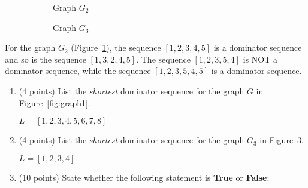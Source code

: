\documentclass[12pt]{article}
\begin{document}
\begin{enumerate}
\begin{figure}[t]
\begin{subfigure}[b]{0.50\linewidth}
        \caption{Graph $G_2$}
        \label{fig:graph2}
        \end{subfigure}
        \begin{subfigure}[b]{0.40\linewidth}
          \centering
        \caption{Graph $G_3$}
        \label{fig:graph3}
        \end{subfigure}
      \caption{}
      \end{figure}

      For the graph $G_2$ (Figure~\ref{fig:graph2}), the sequence $[1,2,3,4,5]$
      is a dominator sequence and so is the sequence $[1,3,2,4,5]$.
      The sequence $[1, 2,3,5,4]$ is NOT a dominator sequence, while
      the sequence $[1,2,3,5,4,5]$ is a dominator sequence. 
      
      \begin{enumerate} 
        \item (4 points) List the \emph{shortest} dominator sequence for the
        graph $G$ in Figure~\ref{fig:graph1}.
        \begin{mdframed}
          $L = [1, 2, 3, 4, 5, 6, 7, 8]$
        \end{mdframed}

        \item (4 points) List the \emph{shortest} dominator sequence for the
        graph $G_3$ in Figure~\ref{fig:graph3}.
        \begin{mdframed}
          $L = [1, 2, 3, 4]$
        \end{mdframed}

        \item (10 points) State whether the following statement is \textbf{True}
        or \textbf{False}: 


\end{enumerate}
\end{enumerate}
\end{document}
